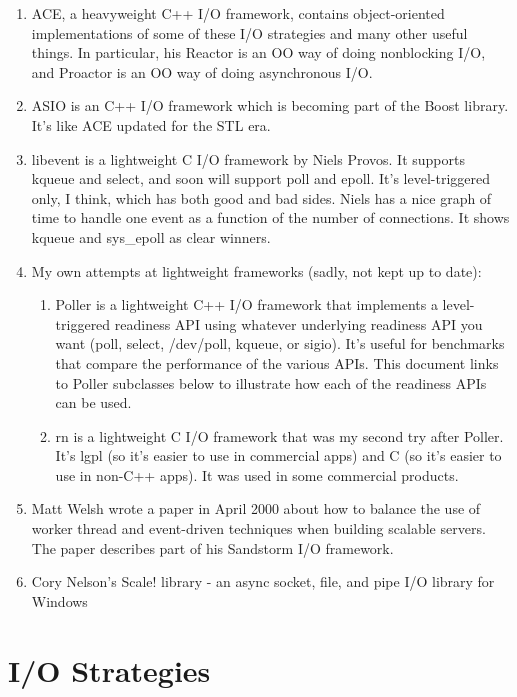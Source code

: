 \documentclass[twoside, xetex]{report}
\begin{document}
	\begin{enumerate}
	
	\item ACE, a heavyweight C++ I/O framework, contains object-oriented implementations of some of these I/O 		
	strategies and many other useful things. In particular, his Reactor is an OO way of doing nonblocking I/O, and 
	Proactor is an OO way of doing asynchronous I/O.
	
	\item ASIO is an C++ I/O framework which is becoming part of the Boost library. It's like ACE updated for the STL era.
	\item libevent is a lightweight C I/O framework by Niels Provos. It supports kqueue and select, and soon will 
	support poll and epoll. It's level-triggered only, I think, which has both good and bad sides. Niels has a nice 
	graph of time to handle one event as a function of the number of connections. It shows kqueue and sys\_epoll as 
	clear winners.
	\item My own attempts at lightweight frameworks (sadly, not kept up to date):
		
		\begin{enumerate}
		\item Poller is a lightweight C++ I/O framework that implements a level-triggered readiness API using 
		whatever underlying readiness API you want (poll, select, /dev/poll, kqueue, or sigio). It's useful for 
		benchmarks that compare the performance of the various APIs. This document links to Poller subclasses below 
		to illustrate how each of the readiness APIs can be used.
		\item rn is a lightweight C I/O framework that was my second try after Poller. It's lgpl (so it's easier to 
		use in commercial apps) and C (so it's easier to use in non-C++ apps). It was used in some commercial 
		products.
		\end{enumerate}
		
	\item Matt Welsh wrote a paper in April 2000 about how to balance the use of worker thread and event-driven 
	techniques when building scalable servers. The paper describes part of his Sandstorm I/O framework.
	\item Cory Nelson's Scale! library - an async socket, file, and pipe I/O library for Windows
	
	\end{enumerate}

\section*{I/O Strategies}
\end{document}
